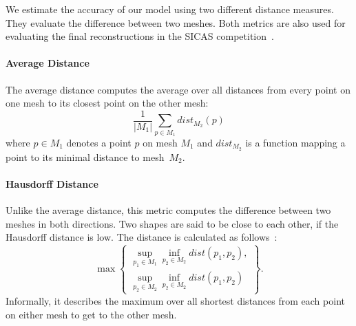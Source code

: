 We estimate the accuracy of our model using two different distance measures.
They evaluate the difference between two meshes.
Both metrics are also used for evaluating the final reconstructions in the SICAS competition~\cite{smir}.

\paragraph{Average Distance}
The average distance computes the average over all distances from every point on one mesh to its closest point on the other mesh:
$$ \frac{1}{|M_1|} \sum_{p \in M_1} \mathit{dist}_{M_2}(p) $$
where $p \in M_1$ denotes a point $p$ on mesh $M_1$ and $\mathit{dist}_{M_2}$ is a function mapping a point to its minimal distance to mesh~$M_2$.

\paragraph{Hausdorff Distance}
Unlike the average distance, this metric computes the difference between two meshes in both directions.
Two shapes are said to be close to each other, if the Hausdorff distance is low.
The distance is calculated as follows~\cite{hausdorff}:
$$ \max \left\{ \begin{array}{ll}
  \sup_{p_1 \in M_1} \inf_{p_2 \in M_2} \mathit{dist}(p_1, p_2), \\
  \sup_{p_2 \in M_2} \inf_{p_2 \in M_2} \mathit{dist}(p_1, p_2) 
\end{array}\right\}. $$
Informally, it describes the maximum over all shortest distances from each point on either mesh to get to the other mesh.
